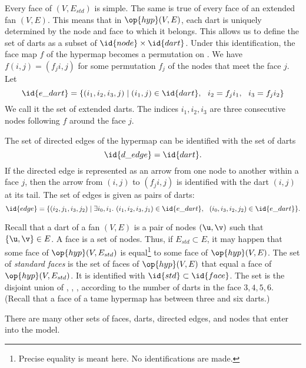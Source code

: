 \begin{definition}
Every face
of $(V,E_{std})$ is simple.  The same is true of every face of an extended fan $(V,E)$.
This means that 
in $\op{hyp}(V,E)$, each dart is uniquely determined by the node and face to
which it belongs.  This allows us to define the set of darts  as a subset of
$\id{node}\times\id{dart}$.
Under this identification, the face map $f$ of the hypermap becomes a permutation
on .  We have $f(i,j) = (f_j i,j)$ for some permutation $f_j$ of the nodes
that meet the face $j$.  Let 
\[
\id{e\_dart} = \{(i_1,i_2,i_3,j) \mid (i_1,j)\in\id{dart},~~ i_2 = f_j i_1,~~ i_3 = f_j i_2\}
\]
We call it the set of extended darts.  The indices $i_1,i_2,i_3$ are three consecutive
nodes following $f$ around the face $j$.
\end{definition}

\begin{definition}
The set of directed edges of the hypermap can be identified with the set of darts
\[
\id{d\_edge} = \id{dart}.
\]
If the directed edge is represented as an arrow from one node to another within a face $j$, then the arrow from $(i,j)$ to $(f_ji,j)$ is identified with the dart $(i,j)$
at its tail.
The set of  edges  is given as pairs of darts:
\[
\id{edge} = \{(i_2,j_1,i_3,j_2) \mid \exists i_0,i_1.~
     (i_1,i_2,i_3,j_1)\in \id{e\_dart},~~ (i_0,i_3,i_2,j_2)\in \id{e\_dart} \}.
\]
\end{definition}

\begin{definition}
Recall that a dart of a fan $(V,E)$ is a pair of nodes $(\u,\v)$ such that $\{\u,\v\}\in E$.
A face is a set of nodes. Thus, if $E_{std}\subset E$, it may happen that some
face of $\op{hyp}(V,E_{std})$ is equal\footnote{Precise equality is meant here. No
identifications are made.} to some face of $\op{hyp}(V,E)$.  The set of
{\it standard faces}  is the set of  faces of $\op{hyp}(V,E)$ that equal a face
of $\op{hyp}(V,E_{std})$.  It is identified with $\id{std}\subset\id{face}$.
The set  is the disjoint union of
, , ,  according to the number of
darts in the face $3,4,5,6$. (Recall that a face of a tame hypermap has between
three and six darts.)
\end{definition}

There are many other sets of faces, darts, directed edges, and nodes
that enter into the model.

